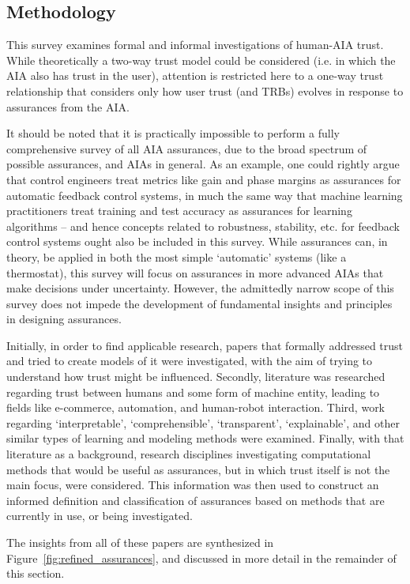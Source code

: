 \subsection{Methodology} \label{sec:methodology}
    This survey examines formal and informal investigations of human-AIA trust. While theoretically a two-way trust model could be considered (i.e. in which the AIA also has trust in the user), attention is restricted here to a one-way trust relationship that considers only how user trust (and TRBs) evolves in response to assurances from the AIA. 

    It should be noted that it is practically impossible to perform a fully comprehensive survey of all AIA assurances, due to the broad spectrum of possible assurances, and AIAs in general. As an example, one could rightly argue that control engineers treat metrics like gain and phase margins as assurances for automatic feedback control systems, in much the same way that machine learning practitioners treat training and test accuracy as assurances for learning algorithms -- and hence concepts related to robustness, stability, etc. for feedback control systems ought also be included in this survey. While assurances can, in theory, be applied in both the most simple `automatic' systems (like a thermostat), this survey will focus on assurances in more advanced AIAs that make decisions under uncertainty. However, the admittedly narrow scope of this survey does not impede the development of fundamental insights and principles in designing assurances.

    Initially, in order to find applicable research, papers that formally addressed trust and tried to create models of it were investigated, with the aim of trying to understand how trust might be influenced. Secondly, literature was researched regarding trust between humans and some form of machine entity, leading to fields like e-commerce, automation, and human-robot interaction. Third, work regarding `interpretable', `comprehensible', `transparent', `explainable', and other similar types of learning and modeling methods were examined. Finally, with that literature as a background, research disciplines investigating computational methods that would be useful as assurances, but in which trust itself is not the main focus, were considered. This information was then used to construct an informed definition and classification of assurances based on methods that are currently in use, or being investigated.
    
    The insights from all of these papers are synthesized in Figure~\ref{fig:refined_assurances}, and discussed in more detail in the remainder of this section.
